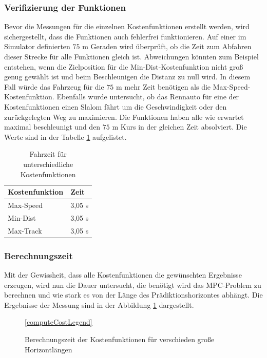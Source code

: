 \documentclass{like}
\begin{document}
\subsubsection{Verifizierung der Funktionen}
Bevor die Messungen für die einzelnen Kostenfunktionen erstellt werden, wird sicher\-ge\-stel\-lt, dass die Funktionen auch fehlerfrei funktionieren. Auf einer im Simulator definierten $75$ m Geraden wird überprüft, ob die Zeit zum Abfahren dieser Strecke für alle Funktionen gleich ist. Abweichungen könnten zum Beispiel entstehen, wenn die Zielposition für die Min-Dist-Kostenfunktion nicht groß genug gewählt ist und beim Beschleunigen die Distanz zu null wird. In diesem Fall würde das Fahrzeug für die $75$ m mehr Zeit benötigen als die Max-Speed-Kostenfunktion. Ebenfalls wurde untersucht, ob das Rennauto für eine der Kostenfunktionen einen Slalom fährt um die Geschwindigkeit oder den zurückgelegten Weg zu maximieren. Die Funktionen haben alle wie erwartet maximal beschleunigt und den $75$ m Kurs in der gleichen Zeit absolviert. Die Werte sind in der Tabelle \ref{accVerification} aufgelistet.

\begin{table}[ht!]
	\centering
	\caption{Fahrzeit für unterschiedliche Kostenfunktionen}
	\begin{tabular}{l|l}
		\hline
		Kostenfunktion	& Zeit  \\ \hline
		Max-Speed	&	3,05 s \\
		Min-Dist	&	3,05 s \\
		Max-Track	&	3,05 s \\

	\end{tabular}

	\label{accVerification}
\end{table}

\subsubsection{Berechnungszeit}
\label{runtime}
Mit der Gewissheit, dass alle Kostenfunktionen die gewünschten Ergebnisse erzeugen, wird nun die Dauer untersucht, die benötigt wird das \ac{MPC}-Problem zu berechnen und wie stark es von der Länge des Prädiktionshorizontes abhängt. 
Die Ergebnisse der Messung sind in der Abbildung \ref{fig:computeCost} dargestellt.

\begin{figure}[ht!]
	\centering
	
	\ref{computeCostLegend}
	\caption{Berechnungszeit der Kostenfunktionen für verschieden große Horizontlängen}\label{fig:computeCost}
\end{figure}
\end{document}
